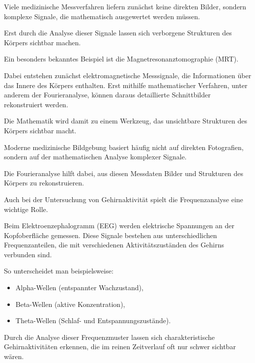 Viele medizinische Messverfahren liefern zunächst keine direkten Bilder,
sondern komplexe Signale,
die mathematisch ausgewertet werden müssen.

Erst durch die Analyse dieser Signale
lassen sich verborgene Strukturen des Körpers sichtbar machen.

\medskip

Ein besonders bekanntes Beispiel ist die Magnetresonanztomographie (MRT).

Dabei entstehen zunächst elektromagnetische Messsignale,
die Informationen über das Innere des Körpers enthalten.
Erst mithilfe mathematischer Verfahren,
unter anderem der Fourieranalyse,
können daraus detaillierte Schnittbilder rekonstruiert werden.

Die Mathematik wird damit zu einem Werkzeug,
das unsichtbare Strukturen des Körpers sichtbar macht.

\begin{PhysicsBox}
	\small
	\label{box:fourier-medizinische-bildgebung}
	Moderne medizinische Bildgebung basiert häufig nicht auf direkten Fotografien,
	sondern auf der mathematischen Analyse komplexer Signale.
	
	Die Fourieranalyse hilft dabei,
	aus diesen Messdaten Bilder und Strukturen des Körpers zu rekonstruieren.
\end{PhysicsBox}

Auch bei der Untersuchung von Gehirnaktivität spielt die Frequenzanalyse eine wichtige Rolle.

Beim Elektroenzephalogramm (EEG)
werden elektrische Spannungen an der Kopfoberfläche gemessen.
Diese Signale bestehen aus unterschiedlichen Frequenzanteilen,
die mit verschiedenen Aktivitätszuständen des Gehirns verbunden sind.

So unterscheidet man beispielsweise:

\begin{itemize}
	\item Alpha-Wellen (entspannter Wachzustand),
	\item Beta-Wellen (aktive Konzentration),
	\item Theta-Wellen (Schlaf- und Entspannungszustände).
\end{itemize}

Durch die Analyse dieser Frequenzmuster
lassen sich charakteristische Gehirnaktivitäten erkennen,
die im reinen Zeitverlauf oft nur schwer sichtbar wären.

